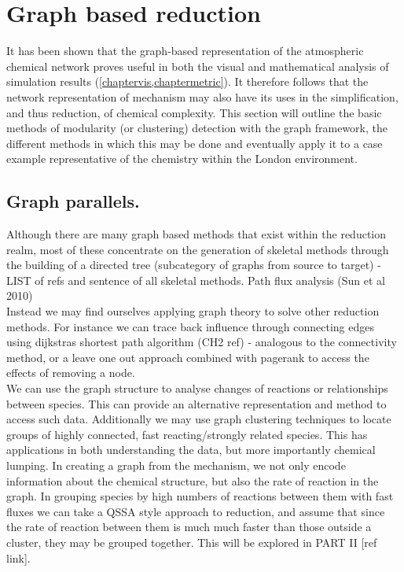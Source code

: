 
\section{Graph based reduction}
It has been shown that the graph-based representation of the atmospheric chemical network proves useful in both the visual and mathematical analysis of simulation results (\autoref{chaptervis,chaptermetric}). It therefore follows that the network representation of mechanism may also have its uses in the simplification, and thus reduction, of chemical complexity.  This section will outline the basic methods of modularity (or clustering) detection with the graph framework, the different methods in which this may be done and eventually apply it to a case example representative of the chemistry within the London environment.









\subsection{Graph parallels. }
Although there are many graph based methods that exist within the reduction realm, most of these concentrate on the generation of skeletal methods through the building of a directed tree (subcategory of graphs from source to target) - LIST of refs and sentence of all skeletal methods. Path flux analysis (Sun et al 2010)\\

Instead we may find ourselves applying graph theory to solve other reduction methods. For instance we can trace back influence through connecting edges using dijkstras shortest path algorithm (CH2 ref) - analogous to the connectivity method, or a leave one out approach combined with pagerank to access the effects of removing a node.\\

We can use the graph structure to analyse changes of reactions or relationships between species. This can provide an alternative representation and method to access such data. Additionally we may use graph clustering techniques to locate groups of highly connected, fast reacting/strongly related species. This has applications in both understanding the data, but more importantly chemical lumping. In creating a graph from the mechanism, we not only encode information about the chemical structure, but also the rate of reaction in the graph. In grouping species by high numbers of reactions between them with fast fluxes we can take a QSSA style approach to reduction, and assume that since the rate of reaction between them is much much faster than those outside a cluster, they may be grouped together. This will be explored in PART II [ref link].








